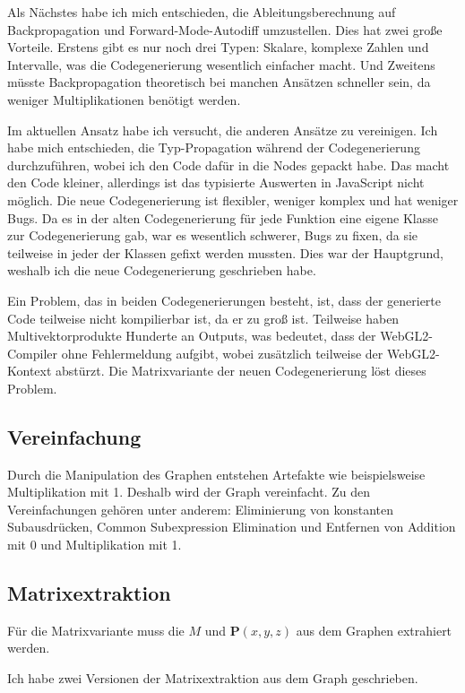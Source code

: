 \documentclass[
	ngerman,%
	accentcolor=9c,%
	ruledheaders=section,%
	class=report,%
	thesis={type=bachelor},%
	fontsize=11pt,%
	parskip=half-,%
	custommargins=true,%
	marginpar=false,%
]{tudapub}
\begin{document}
Als Nächstes habe ich mich entschieden, die Ableitungsberechnung auf Backpropagation und Forward-Mode-Autodiff umzustellen. Dies hat zwei große Vorteile.
Erstens gibt es nur noch drei Typen: Skalare, komplexe Zahlen und Intervalle, was die Codegenerierung wesentlich einfacher macht. Und Zweitens müsste Backpropagation theoretisch bei manchen Ansätzen schneller sein, da weniger Multiplikationen benötigt werden.

Im aktuellen Ansatz habe ich versucht, die anderen Ansätze zu vereinigen.
Ich habe mich entschieden, die Typ-Propagation während der Codegenerierung durchzuführen, wobei ich den Code dafür in die Nodes gepackt habe. Das macht den Code kleiner, allerdings ist das typisierte Auswerten in JavaScript nicht möglich.
Die neue Codegenerierung ist flexibler, weniger komplex und hat weniger Bugs. Da es in der alten Codegenerierung für jede Funktion eine eigene Klasse zur Codegenerierung gab, war es wesentlich schwerer, Bugs zu fixen, da sie teilweise in jeder der Klassen gefixt werden mussten. Dies war der Hauptgrund, weshalb ich die neue Codegenerierung geschrieben habe.

Ein Problem, das in beiden Codegenerierungen besteht, ist, dass der generierte Code teilweise nicht kompilierbar ist, da er zu groß ist.
Teilweise haben Multivektorprodukte Hunderte an Outputs, was bedeutet, dass der WebGL2-Compiler ohne Fehlermeldung aufgibt, wobei zusätzlich teilweise der WebGL2-Kontext abstürzt. Die Matrixvariante der neuen Codegenerierung löst dieses Problem.

\subsection{Vereinfachung}
Durch die Manipulation des Graphen entstehen Artefakte wie beispielsweise Multiplikation mit 1. Deshalb wird der Graph vereinfacht. Zu den Vereinfachungen gehören unter anderem:
Eliminierung von konstanten Subausdrücken,
Common Subexpression Elimination und
Entfernen von Addition mit 0 und Multiplikation mit 1.



\subsection{Matrixextraktion}
Für die Matrixvariante muss die $M$ und $\mathbf{P}(x,y,z)$ aus dem Graphen extrahiert werden.

Ich habe zwei Versionen der Matrixextraktion aus dem Graph geschrieben.  
\end{document}
